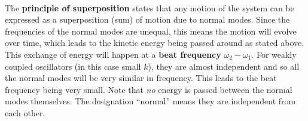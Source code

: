 \documentclass[../classical_mechanics.tex]{subfiles}
\begin{document}
        \paragraph{}
        The \textbf{principle of superposition} states that any motion of the system can be expressed as a superposition (sum) of motion due to normal modes.
        Since the frequencies of the normal modes are unequal, this means the motion will evolve over time, which leads to the kinetic energy being passed around as stated above.
        This exchange of energy will happen at a \textbf{beat frequency} $\omega_2-\omega_1$.
        For weakly coupled oscillators (in this case small $k$), they are almost independent and so all the normal modes will be very similar in frequency.
        This leads to the beat frequency being very small.
        Note that \textit{no} energy is passed between the normal modes themselves.
        The designation ``normal'' means they are independent from each other.
\end{document}
